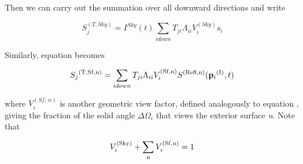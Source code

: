 Then we can carry out the summation over all downward directions and write

\begin{equation}
  S_j^{(T,Sky)} = I^{Sky}(t)\sum_{i down} T_{ji} \Lambda_{ii} V_i^{(Sky)} {s_i}
\end{equation}

Similarly, equation becomes

\begin{equation}
{S_j}^{{\rm{(T, Sf, n)}}} = \sum\limits_{i{\rm{ }}down} {{T_{ji}}{\Lambda_{ii}}V_i^{{\rm{(Sf, n)}}}{S^{{\rm{(Refl, n)}}}}({{\bf{p}}_i}^{{\rm{(I)}}},t)}
\end{equation}

where \(V_{i}^{(Sf,\, n)}\) is another geometric view factor, defined analogously to equation , giving the fraction of the solid angle \(\Delta {\Omega_i}\) that views the exterior surface \emph{n}. Note that

\begin{equation}
V_i^{{\rm{(Sky)}}} + \sum\limits_{\rm{n}} {V_i^{{\rm{(Sf, n)}}}}  = 1
\end{equation}

